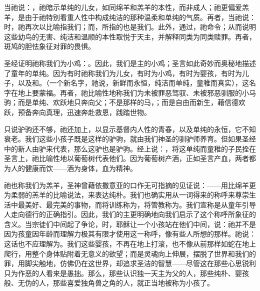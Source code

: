 当祂说：，祂暗示单纯的儿女，如同绵羊和羔羊的本性，而非成人；祂更偏爱羔羊，是由于祂特别看重人性中构成纯洁的那种温柔和单纯的气质。再者，当祂说：时，祂再次以比喻指我们；而，所指的也是我们。此外，通过，祂命令；从而说明这些幼鸟的无害、纯洁和温顺的本性取悦于天主，并解释同类为同类赎罪。再者，斑鸠的胆怯象征对罪的畏惧。\par

圣经证明祂称我们为小鸡：。因此，我们是主的小鸡；圣言如此奇妙而奥秘地描述了童年的单纯。因为有时祂称我们为儿女，有时为小鸡，有时为婴孩，有时为儿子，以及和。（一个新名字，祂说，新鲜而永恒，纯洁而单纯，童稚而真实），这名字在地上要蒙福。再者，祂比喻性地称我们为未被罪恶驾驭、未被邪恶驯服的小马驹；而是单纯、欢跃地只奔向父；不是那样的马，；而是自由而新生，藉信德欢跃，预备奔向真理，迅速奔赴救恩，践踏世物。\par

 只说驴驹还不够，祂还加上，以显示基督内人性的青春，以及单纯的永恒，它不知衰老。我们这些小孩子既是这样的驴驹，就由我们神圣的驯驴师养育。但如果圣经中的新人由驴来代表，那么这驴也是驴驹。经上说：，将这单纯而童稚的子民拴在圣言上，祂比喻性地以葡萄树代表他们。因为葡萄树产酒，正如圣言产血，两者都为人的健康而饮——酒为身体，血为精神。\par

祂也称我们为羔羊，圣神曾藉依撒意亚的口作无可指摘的见证说：——用比绵羊更为柔弱的羔羊的比喻说法，来表达纯朴。我们也确实用从一词得来的称呼来尊崇生活中最美好、最完美的事物，而将训练称为，将管教称为。我们宣称是从童年引导人走向德行的正确指引。因此，我们的主更明确地向我们启示了这个称呼所象征的含义。当宗徒们中间起了争论，时，耶稣让一个小孩站在他们中间，说：祂并不是因为孩童因年龄而理解力极其有限才使用这一称呼，像有些人所想的那样。祂说：这话也不应理解为。我们这些婴孩，不再在地上打滚，也不像从前那样如蛇在地上爬行，用整个身体贴附着无意义的欲望；而是灵魂向上伸展，摆脱了世界和我们的罪，用脚尖触地，仿佛仍在这世界，却追求圣洁的智慧——尽管这在那些心思锐利只为作恶的人看来是愚拙。那么，那些认识独一天主为父的人，那些纯朴、婴孩般、无伪的人，那些喜爱独角兽之角的人，就正当地被称为小孩了。\par

